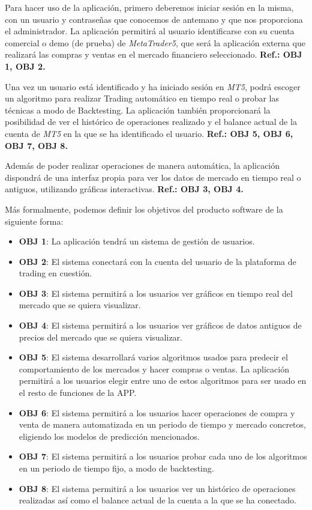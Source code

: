 Para hacer uso de la aplicación, primero deberemos iniciar sesión en la misma, con un usuario y contraseñas que conocemos de antemano y que nos proporciona el administrador. La aplicación permitirá al usuario identificarse con su cuenta comercial o demo (de prueba) de \textit{MetaTrader5}, que será la aplicación externa que realizará las compras y ventas en el mercado financiero seleccionado. \textbf{Ref.: OBJ 1, OBJ 2.} \newline

Una vez un usuario está identificado y ha iniciado sesión en \textit{MT5}, podrá escoger un algoritmo para realizar Trading automático en tiempo real o probar las técnicas a modo de Backtesting. La aplicación también proporcionará la posibilidad de ver el histórico de operaciones realizado y el balance actual de la cuenta de \textit{MT5} en la que se ha identificado el usuario. \textbf{Ref.: OBJ 5, OBJ 6, OBJ 7, OBJ 8.} \newline

Además de poder realizar operaciones de manera automática, la aplicación dispondrá de una interfaz propia para ver los datos de mercado en tiempo real o antiguos, utilizando gráficas interactivas. \textbf{Ref.: OBJ 3, OBJ 4.}\newline

Más formalmente, podemos definir los objetivos del producto software de la siguiente forma:


\begin{itemize}
	
	\item \textbf{OBJ 1}: La aplicación tendrá un sistema de gestión de usuarios.	
	\item \textbf{OBJ 2}: El sistema conectará con la cuenta del usuario de la plataforma de trading en cuestión.
	\item \textbf{OBJ 3}: El sistema permitirá a los usuarios ver gráficos en tiempo real del mercado que se quiera visualizar.
	\item \textbf{OBJ 4}: El sistema permitirá a los usuarios ver gráficos de datos antiguos de precios del mercado que se quiera visualizar.
	\item \textbf{OBJ 5}: El sistema desarrollará varios algoritmos usados para predecir el comportamiento de los mercados y hacer compras o ventas. La aplicación permitirá a los usuarios elegir entre uno de estos algoritmos para ser usado en el resto de funciones de la APP.
	\item \textbf{OBJ 6}: El sistema permitirá a los usuarios hacer operaciones de compra y venta de manera automatizada en un periodo de tiempo y mercado concretos, eligiendo los modelos de predicción mencionados.
	\item \textbf{OBJ 7}: El sistema permitirá a los usuarios probar cada uno de los algoritmos en un periodo de tiempo fijo, a modo de backtesting.
	\item \textbf{OBJ 8}: El sistema permitirá a los usuarios ver un histórico de operaciones realizadas así como el balance actual de la cuenta a la que se ha conectado.
	
\end{itemize}

